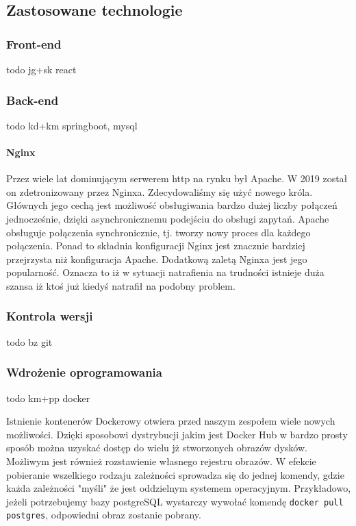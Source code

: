 \documentclass[10pt, titlepage, oneside, a4paper]{article}
\begin{document}
	\subsection{Zastosowane technologie}

	\subsubsection{Front-end}	
	todo jg+sk react
	
	\subsubsection{Back-end}	
	todo kd+km springboot, mysql
	\paragraph{Nginx}
	Przez wiele lat dominującym serwerem http na rynku był Apache. W 2019 został on zdetronizowany przez Nginxa. 
	Zdecydowaliśmy się użyć nowego króla. Głównych jego cechą jest możliwość obsługiwania bardzo dużej liczby
	połączeń jednocześnie, dzięki asynchronicznemu podejściu do obsługi zapytań. Apache obsługuje połączenia
	synchronicznie, tj. tworzy nowy proces dla każdego połączenia. Ponad to składnia konfiguracji Nginx jest
	znacznie bardziej przejrzysta niż konfiguracja Apache. Dodatkową zaletą Nginxa jest jego popularność. Oznacza
	to iż w sytuacji natrafienia na trudności istnieje duża szansa iż ktoś już kiedyś natrafił na podobny problem.
	
	\subsubsection{Kontrola wersji}
	todo bz git
	  
	\subsubsection{Wdrożenie oprogramowania}
	todo km+pp docker

	Istnienie kontenerów Dockerowy otwiera przed naszym zespołem wiele nowych możliwości. Dzięki sposobowi dystrybucji
	jakim jest Docker Hub w bardzo prosty sposób można uzyskać dostęp do wielu jż stworzonych obrazów dysków. Możliwym
	jest również rozstawienie własnego rejestru obrazów. W efekcie pobieranie wszelkiego rodzaju zależności sprowadza
	się do jednej komendy, gdzie każda zależności "myśli" że jest oddzielnym systemem operacyjnym. Przykładowo,
	jeżeli potrzebujemy bazy postgreSQL wystarczy wywołać komendę \texttt{docker pull postgres}, odpowiedni obraz
	zostanie pobrany.
	
\end{document}
